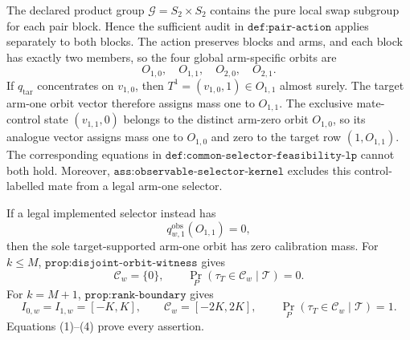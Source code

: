 The declared product group \(\mathcal G=S_2\times S_2\) contains the pure local swap subgroup for each pair block. Hence the sufficient audit in \(\texttt{def:pair-action}\) applies separately to both blocks. The action preserves blocks and arms, and each block has exactly two members, so the four global arm-specific orbits are
\[
O_{1,0},\quad O_{1,1},\quad O_{2,0},\quad O_{2,1}.
\tag{1}
\]
If \(q_{\mathrm{tar}}\) concentrates on \(v_{1,0}\), then \(T^1=(v_{1,0},1)\in O_{1,1}\) almost surely. The target arm-one orbit vector therefore assigns mass one to \(O_{1,1}\). The exclusive mate-control state \((v_{1,1},0)\) belongs to the distinct arm-zero orbit \(O_{1,0}\), so its analogue vector assigns mass one to \(O_{1,0}\) and zero to the target row \((1,O_{1,1})\). The corresponding equations in \(\texttt{def:common-selector-feasibility-lp}\) cannot both hold. Moreover, \(\texttt{ass:observable-selector-kernel}\) excludes this control-labelled mate from a legal arm-one selector.

If a legal implemented selector instead has
\[
q^{\mathrm{obs}}_{w,1}(O_{1,1})=0,
\tag{2}
\]
then the sole target-supported arm-one orbit has zero calibration mass. For \(k\le M\), \(\texttt{prop:disjoint-orbit-witness}\) gives
\[
\mathcal C_w=\{0\},
\qquad
\Pr_P(\tau_T\in\mathcal C_w\mid\mathcal T)=0.
\tag{3}
\]
For \(k=M+1\), \(\texttt{prop:rank-boundary}\) gives
\[
I_{0,w}=I_{1,w}=[-K,K],\qquad
\mathcal C_w=[-2K,2K],\qquad
\Pr_P(\tau_T\in\mathcal C_w\mid\mathcal T)=1.
\tag{4}
\]
Equations (1)--(4) prove every assertion.